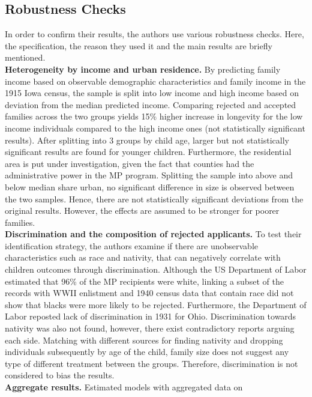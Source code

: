 \subsection{Robustness Checks}
In order to confirm their results, the authors use various robustness
checks. Here, the specification, the reason they used it and the main
results are briefly mentioned.\\
  \textbf{Heterogeneity by income and urban residence.} By predicting
  family income based on observable demographic characteristics and
  family income in the 1915 Iowa census, the sample is split into low
  income and high income based on deviation from the median predicted
  income. Comparing rejected and accepted families across the two groups
  yields 15\% higher increase in longevity for the low income
  individuals compared to the high income ones (not statistically
  significant results). After splitting into 3 groups by child age,
  larger but not statistically significant results are found for younger
  children. Furthermore, the residential area is put under
  investigation, given the fact that counties had the administrative
  power in the MP program. Splitting the sample into above and below
  median share urban, no significant difference in size is observed
  between the two samples. Hence, there are not statistically significant deviations from the original results. However, the effects are assumed to be stronger for poorer families.\\
  \textbf{Discrimination and the composition of rejected applicants.} To
  test their identification strategy, the authors examine if there are
  unobservable characteristics such as race and nativity, that can
  negatively correlate with children outcomes through discrimination.
  Although the US Department of Labor estimated that 96\% of the MP
  recipients were white, linking a subset of the records with WWII
  enlistment and 1940 census data that contain race did not show that
  blacks were more likely to be rejected. Furthermore, the Department of
  Labor reposted lack of discrimination in 1931 for Ohio. Discrimination
  towards nativity was also not found, however, there exist
  contradictory reports arguing each side. Matching with different
  sources for finding nativity and dropping individuals subsequently by
  age of the child, family size does not suggest any type of different
  treatment between the groups. Therefore, discrimination is not considered to bias the results.\\
  \textbf{Aggregate results.} Estimated models with aggregated data on
